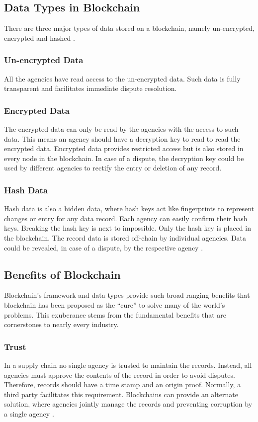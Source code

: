 \documentclass[sigconf]{acmart}
\begin{document}
\subsection{Data Types in Blockchain}
There are three major types of data stored on a blockchain, namely un-encrypted, encrypted and hashed \cite{arbc1}. 

\subsubsection{Un-encrypted Data} All the agencies have read access to the un-encrypted data. Such data is fully transparent and facilitates immediate dispute resolution.

\subsubsection{Encrypted Data} The encrypted data can only be read by the agencies with the access to such data. This means an agency should have a decryption key to read to read the encrypted data. Encrypted data provides restricted access but is also stored in every node in the blockchain. In case of a dispute, the decryption key could be used by different agencies to rectify the entry or deletion of any record.

\subsubsection{Hash Data} Hash data is also a hidden data, where hash keys act like fingerprints to represent changes or entry for any data record. Each agency can easily confirm their hash keys. Breaking the hash key is next to impossible. Only the hash key is placed in the blockchain. The record data is stored off-chain by individual agencies. Data could be revealed, in case of a dispute, by the respective agency \cite{arbc1}.

\subsection{Benefits of Blockchain}
Blockchain's framework and data types provide such broad-ranging benefits that blockchain has been proposed as the ``cure'' to solve many of the world's problems. This exuberance stems from the fundamental benefits that are cornerstones to nearly every industry.

\subsubsection{Trust} In a supply chain no single agency is trusted to maintain the records. Instead, all agencies must approve the contents of the record in order to avoid disputes. Therefore, records should have a time stamp and an origin proof. Normally, a third party facilitates this requirement. Blockchains can provide an alternate solution, where agencies jointly manage the records and preventing corruption by a single agency \cite{arbc1}. 
\end{document}
